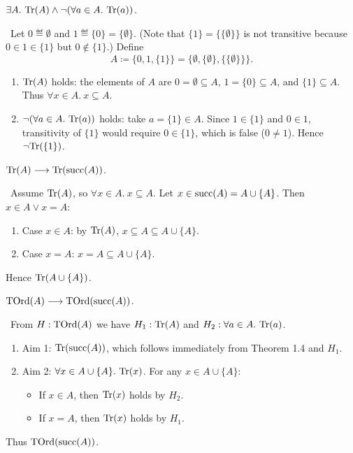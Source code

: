\documentclass[10pt,a4paper]{article}
\begin{document}
\begin{theorem}
$\exists A.\ {\textrm{Tr}}(A) \land \neg (\forall a\in A.\ {\textrm{Tr}}(a))$.
\end{theorem}
\myprf\ Let $0 \eqdef \emptyset$ and $1 \eqdef \{0\} = \{\emptyset\}$. (Note that $\{1\} = \{\{\emptyset\}\}$ is not transitive because $0 \in 1 \in \{1\}$ but $0 \notin \{1\}$.) Define
$$A \coloneqq \{0, 1, \{1\}\} = \{\emptyset, \{\emptyset\}, \{\{\emptyset\}\}\}.$$
\begin{enumerate}
\item ${\textrm{Tr}}(A)$ holds: the elements of $A$ are $0 = \emptyset \subseteq A$, $1 = \{0\} \subseteq A$, and $\{1\} \subseteq A$. Thus $\forall x \in A.\ x \subseteq A$.
\item $\neg (\forall a \in A.\ \Tr(a))$ holds: take $a = \{1\} \in A$. Since $1 \in \{1\}$ and $0 \in 1$, transitivity of $\{1\}$ would require $0 \in \{1\}$, which is false ($0 \neq 1$). Hence $\neg {\textrm{Tr}}(\{1\})$.
\end{enumerate}
\myqed

\begin{theorem}
${\textrm{Tr}}(A) \longrightarrow {\textrm{Tr}}({\textrm{succ}}(A))$.
\end{theorem}
\myprf\ Assume ${\textrm{Tr}}(A)$, so $\forall x\in A.\ x\subseteq A$. Let $x \in {\textrm{succ}}(A) = A\cup\{A\}$. Then $x\in A \lor x=A$:
\begin{enumerate}
\item Case $x\in A$: by ${\textrm{Tr}}(A)$, $x\subseteq A \subseteq A\cup\{A\}$.
\item Case $x = A$: $x = A \subseteq A\cup\{A\}$.
\end{enumerate}
Hence ${\textrm{Tr}}(A\cup\{A\})$. \myqed

\begin{theorem}
${\textrm{TOrd}}(A) \longrightarrow {\textrm{TOrd}}({\textrm{succ}}(A))$.
\end{theorem}
\myprf\ From $H: {\textrm{TOrd}}(A)$ we have $H_1: {\textrm{Tr}}(A)$ and $H_2: \forall a\in A.\ {\textrm{Tr}}(a)$.
\begin{enumerate}
\item Aim 1: ${\textrm{Tr}}({\textrm{succ}}(A))$, which follows immediately from Theorem 1.4 and $H_1$.
\item Aim 2: $\forall x\in A\cup\{A\}.\ \Tr(x)$. For any $x \in A \cup \{A\}$:
  \begin{itemize}
  \item If $x\in A$, then ${\textrm{Tr}}(x)$ holds by $H_2$.
  \item If $x = A$, then ${\textrm{Tr}}(x)$ holds by $H_1$.
  \end{itemize}
\end{enumerate}
Thus ${\textrm{TOrd}}({\textrm{succ}}(A))$. \myqed
\end{document}
